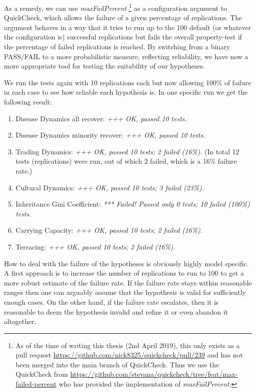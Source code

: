 As a remedy, we can use \textit{maxFailPercent} \footnote{As of the time of writing this thesis (2nd April 2019), this only exists as a pull request \url{https://github.com/nick8325/quickcheck/pull/239} and has not been merged into the main branch of QuickCheck. Thus we use the QuickCheck from \url{https://github.com/stevana/quickcheck/tree/feat/max-failed-percent} who has provided the implementation of \textit{maxFailPercent}.} as a configuration argument to QuickCheck, which allows the failure of a given percentage of replications. The argument behaves in a way that it tries to run up to the 100 default (or whatever the configuration is) successful replications but fails the overall property-test if the percentage of failed replications is reached. By switching from a binary PASS/FAIL to a more probabilistic measure, reflecting reliability, we have now a more appropriate tool for testing the suitability of our hypotheses. 

We run the tests again with 10 replications each but now allowing 100\% of failure in each case to see how reliable each hypothesis is. In one specific run we get the following result:

\begin{enumerate}
	\item Disease Dynamics all recover: \textit{+++ OK, passed 10 tests.}

	\item Disease Dynamics minority recover: \textit{+++ OK, passed 10 tests.}
		
	\item Trading Dynamics: \textit{+++ OK, passed 10 tests; 2 failed (16\%).} (In total 12 tests (replications) were run, out of which 2 failed, which is a 16\% failure rate.)
	
	\item Cultural Dynamics: \textit{+++ OK, passed 10 tests; 3 failed (23\%).}

	\item Inheritance Gini Coefficient: \textit{*** Failed! Passed only 0 tests; 10 failed (100\%) tests.}

	\item Carrying Capacity: \textit{+++ OK, passed 10 tests; 2 failed (16\%).}

	\item Terracing: \textit{+++ OK, passed 10 tests; 2 failed (16\%).}
\end{enumerate}

How to deal with the failure of the hypotheses is obviously highly model specific. A first approach is to increase the number of replications to run to 100 to get a more robust estimate of the failure rate. If the failure rate stays within reasonable ranges then one can arguably assume that the hypothesis is valid for sufficiently enough cases. On the other hand, if the failure rate escalates, then it is reasonable to deem the hypothesis invalid and refine it or even abandon it altogether.

